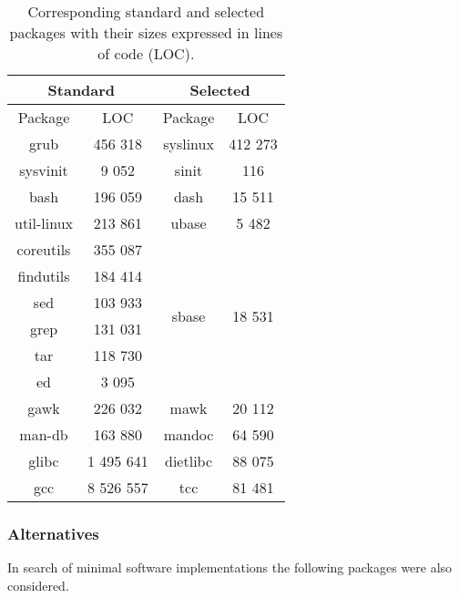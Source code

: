 \begin{table}[!h]
    \centering
    \begin{tabular}{|c|c||c|c|}
        \hline
        \multicolumn{2}{|c||}{Standard} & \multicolumn{2}{|c|}{Selected} \\
        \hline
        \hline
        Package & LOC & Package & LOC \\
        \hline
        \hline
        grub \cite{grub} & 456 318 & syslinux \cite{syslinux} & 412 273 \\
        \hline
        sysvinit \cite{sysvinit} & 9 052 & sinit \cite{sinit} & 116 \\
        \hline
        bash \cite{bash} & 196 059 & dash \cite{dash} & 15 511 \\
        \hline
        util-linux \cite{util-linux} & 213 861 & ubase \cite{ubase} & 5 482 \\
        \hline
        coreutils \cite{coreutils} & 355 087 & \multirow{6}{*}{sbase \cite{sbase}} & \multirow{6}{*}{18 531} \\
        findutils \cite{findutils} & 184 414 & & \\
        sed \cite{sed} & 103 933 & & \\
        grep \cite{grep} & 131 031 & & \\
        tar \cite{tar} & 118 730 & & \\
        ed \cite{ed} & 3 095 & & \\
        \hline
        gawk \cite{gawk} & 226 032 & mawk \cite{mawk} & 20 112 \\
        \hline
        man-db \cite{man-db} & 163 880 & mandoc \cite{mandoc} & 64 590 \\
        \hline
        glibc \cite{glibc} & 1 495 641 & dietlibc \cite{dietlibc} & 88 075 \\
        \hline
        gcc \cite{gcc} & 8 526 557 & tcc \cite{tcc} & 81 481 \\
        \hline
    \end{tabular}
    \caption{Corresponding standard and selected packages with their sizes expressed in lines of code (LOC).}
\end{table}

\newpage

\subsubsection{Alternatives}

In search of minimal software implementations the following packages were also considered.

